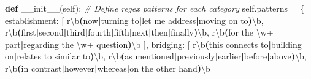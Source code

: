 \documentclass[
  11pt]{article}
\newenvironment{Shaded}{}{}
\newcommand{\CommentTok}[1]{\textcolor[rgb]{0.38,0.63,0.69}{\textit{#1}}}
\newcommand{\ControlFlowTok}[1]{\textcolor[rgb]{0.00,0.44,0.13}{\textbf{#1}}}
\newcommand{\DecValTok}[1]{\textcolor[rgb]{0.25,0.63,0.44}{#1}}
\newcommand{\FunctionTok}[1]{\textcolor[rgb]{0.02,0.16,0.49}{#1}}
\newcommand{\KeywordTok}[1]{\textcolor[rgb]{0.00,0.44,0.13}{\textbf{#1}}}
\newcommand{\NormalTok}[1]{#1}
\newcommand{\OperatorTok}[1]{\textcolor[rgb]{0.40,0.40,0.40}{#1}}
\newcommand{\StringTok}[1]{\textcolor[rgb]{0.25,0.44,0.63}{#1}}
\newcommand{\VariableTok}[1]{\textcolor[rgb]{0.10,0.09,0.49}{#1}}
\newcommand{\VerbatimStringTok}[1]{\textcolor[rgb]{0.25,0.44,0.63}{#1}}
\begin{document}
\begin{Shaded}
\begin{Highlighting}[]
    \KeywordTok{def} \FunctionTok{\_\_init\_\_}\NormalTok{(}\VariableTok{self}\NormalTok{):}
        \CommentTok{\# Define regex patterns for each category}
        \VariableTok{self}\NormalTok{.patterns }\OperatorTok{=}\NormalTok{ \{}
            \StringTok{\textquotesingle{}establishment\textquotesingle{}}\NormalTok{: [}
                \VerbatimStringTok{r\textquotesingle{}}\DecValTok{\textbackslash{}b}\KeywordTok{(}\VerbatimStringTok{now}\ControlFlowTok{|}\VerbatimStringTok{turning to}\ControlFlowTok{|}\VerbatimStringTok{let me address}\ControlFlowTok{|}\VerbatimStringTok{moving on to}\KeywordTok{)}\DecValTok{\textbackslash{}b}\VerbatimStringTok{\textquotesingle{}}\NormalTok{,}
                \VerbatimStringTok{r\textquotesingle{}}\DecValTok{\textbackslash{}b}\KeywordTok{(}\VerbatimStringTok{first}\ControlFlowTok{|}\VerbatimStringTok{second}\ControlFlowTok{|}\VerbatimStringTok{third}\ControlFlowTok{|}\VerbatimStringTok{fourth}\ControlFlowTok{|}\VerbatimStringTok{fifth}\ControlFlowTok{|}\VerbatimStringTok{next}\ControlFlowTok{|}\VerbatimStringTok{then}\ControlFlowTok{|}\VerbatimStringTok{finally}\KeywordTok{)}\DecValTok{\textbackslash{}b}\VerbatimStringTok{\textquotesingle{}}\NormalTok{,}
                \VerbatimStringTok{r\textquotesingle{}}\DecValTok{\textbackslash{}b}\KeywordTok{(}\VerbatimStringTok{for the }\DecValTok{\textbackslash{}w}\OperatorTok{+}\VerbatimStringTok{ part}\ControlFlowTok{|}\VerbatimStringTok{regarding the }\DecValTok{\textbackslash{}w}\OperatorTok{+}\VerbatimStringTok{ question}\KeywordTok{)}\DecValTok{\textbackslash{}b}\VerbatimStringTok{\textquotesingle{}}
\NormalTok{            ],}
            \StringTok{\textquotesingle{}bridging\textquotesingle{}}\NormalTok{: [}
                \VerbatimStringTok{r\textquotesingle{}}\DecValTok{\textbackslash{}b}\KeywordTok{(}\VerbatimStringTok{this connects to}\ControlFlowTok{|}\VerbatimStringTok{building on}\ControlFlowTok{|}\VerbatimStringTok{relates to}\ControlFlowTok{|}\VerbatimStringTok{similar to}\KeywordTok{)}\DecValTok{\textbackslash{}b}\VerbatimStringTok{\textquotesingle{}}\NormalTok{,}
                \VerbatimStringTok{r\textquotesingle{}}\DecValTok{\textbackslash{}b}\KeywordTok{(}\VerbatimStringTok{as mentioned}\ControlFlowTok{|}\VerbatimStringTok{previously}\ControlFlowTok{|}\VerbatimStringTok{earlier}\ControlFlowTok{|}\VerbatimStringTok{before}\ControlFlowTok{|}\VerbatimStringTok{above}\KeywordTok{)}\DecValTok{\textbackslash{}b}\VerbatimStringTok{\textquotesingle{}}\NormalTok{,}
                \VerbatimStringTok{r\textquotesingle{}}\DecValTok{\textbackslash{}b}\KeywordTok{(}\VerbatimStringTok{in contrast}\ControlFlowTok{|}\VerbatimStringTok{however}\ControlFlowTok{|}\VerbatimStringTok{whereas}\ControlFlowTok{|}\VerbatimStringTok{on the other hand}\KeywordTok{)}\DecValTok{\textbackslash{}b}\VerbatimStringTok{\textquotesingle{}}

\end{Highlighting}
\end{Shaded}
\end{document}
